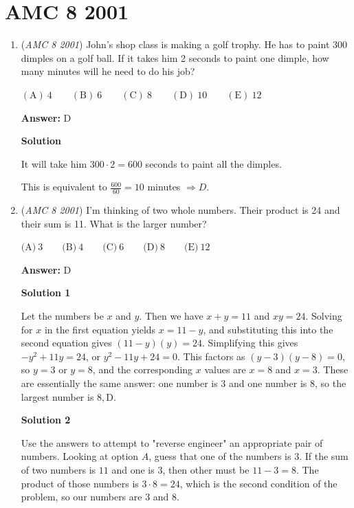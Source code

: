\section{AMC 8 2001}
        \begin{enumerate}
        	\item (\textit{AMC 8 2001}) John's shop class is making a golf trophy. He has to paint 300 dimples on a golf ball. If it takes him 2 seconds to paint one dimple, how many minutes will he need to do his job?


 $\mathrm{(A) \ 4 } \qquad \mathrm{(B) \ 6 } \qquad \mathrm{(C) \ 8 } \qquad \mathrm{(D) \ 10 } \qquad \mathrm{(E) \ 12 }$

 \textbf{Answer: }D



\textbf{Solution}

It will take him $300\cdot2=600$ seconds to paint all the dimples. 

 This is equivalent to $\frac{600}{60}=10$ minutes $\Rightarrow \boxed{D}$.

 


	\item (\textit{AMC 8 2001}) I'm thinking of two whole numbers. Their product is 24 and their sum is 11. What is the larger number?


 



 $\text{(A)}\ 3 \qquad \text{(B)}\ 4 \qquad \text{(C)}\ 6 \qquad \text{(D)}\ 8 \qquad \text{(E)}\ 12$

 \textbf{Answer: }D



\textbf{Solution 1}

Let the numbers be $x$ and $y$. Then we have $x+y=11$ and $xy=24$. Solving for $x$ in the first equation yields $x=11-y$, and substituting this into the second equation gives $(11-y)(y)=24$. Simplifying this gives $-y^2+11y=24$, or $y^2-11y+24=0$. This factors as $(y-3)(y-8)=0$, so $y=3$ or $y=8$, and the corresponding $x$ values are $x=8$ and $x=3$. These are essentially the same answer: one number is $3$ and one number is $8$, so the largest number is $8, \boxed{\text{D}}$.

 



\textbf{Solution 2}

Use the answers to attempt to "reverse engineer" an appropriate pair of numbers.  Looking at option $A$, guess that one of the numbers is $3$.  If the sum of two numbers is $11$ and one is $3$, then other must be $11 - 3 = 8$.  The product of those numbers is $3\cdot 8 = 24$, which is the second condition of the problem, so our numbers are $3$ and $8$.


\end{enumerate}
